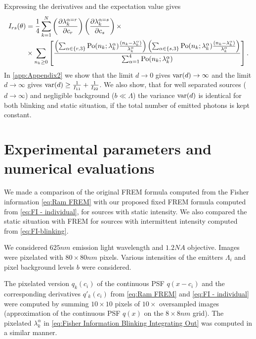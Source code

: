 Expressing the derivatives and the expectation value gives
%
\begin{alignat}{2}
	I_{rs}(\theta)
	&=\frac{1}{4}\sum_{k=1}^N\left(\frac{\partial\lambda_k^{\alpha=r}}{\partial c_r}\right)\left(\frac{\partial\lambda_k^{\alpha=s}}{\partial c_s}\right)\times \nonumber\\
	&\times \sum_{n_k\geq0}\left[\frac{\left(\sum_{\alpha\in \{r,3\}}\mathrm{Po}(n_k;\lambda_k^\alpha)\frac{(n_k-\lambda_k^\alpha)}{\lambda_k^\alpha}\right)\left(\sum_{\alpha\in \{s,3\}}\mathrm{Po}(n_k;\lambda_k^\alpha)\frac{(n_k-\lambda_k^\alpha)}{\lambda_k^\alpha}\right)}{\sum_{\alpha=1}^4\mathrm{Po}(n_k;\lambda_k^\alpha)}\right].
	\label{eq:FI-blinking}
\end{alignat}
%
In \autoref{app:Appendix2} we show that the limit $d\rightarrow0$ gives $\mathrm{var}(d)\rightarrow\infty$ and the limit $d\rightarrow\infty$ gives $\mathrm{var}(d)\geq\frac{1}{I_{11}}+\frac{1}{I_{22}}$. We also show, that for well separated sources ($d\rightarrow\infty$) and negligible background ($b\ll\Lambda$) the variance $\mathrm{var}(d)$ is identical for both blinking and static situation, if the total number of emitted photons is kept constant. 

\clearpage
\section{Experimental parameters and numerical evaluations\label{sec:FREM simulations}} 
We made a comparison of the original FREM formula computed from the Fisher information \autoref{eq:Ram FREM} with our proposed fixed FREM formula computed from \autoref{eq:FI - individual}, for sources with static intensity. We also compared the static situation with FREM for sources with intermittent intensity computed from \autoref{eq:FI-blinking}.

We considered $625\unit{nm}$ emission light wavelength and $1.2\unit{NA}$ objective. Images were pixelated with $80\times80\unit{nm}$ pixels. Various intensities of the emitters $\Lambda_i$ and pixel background levels $b$ were considered.

The pixelated version $q_k(c_i)$ of the continuous PSF $q(x-c_i)$ and the corresponding derivatives $q'_k(c_i)$ from \autoref{eq:Ram FREM} and \autoref{eq:FI - individual} were computed by summing $10\times10$ pixels of $10\times$ oversampled images (approximation of the continuous PSF $q(x)$ on the $8\times8 \unit{nm}$ grid). The pixelated $\lambda^\alpha_k$ in \autoref{eq:Fisher Information Blinking Integrating Out} was computed in a similar manner. 


